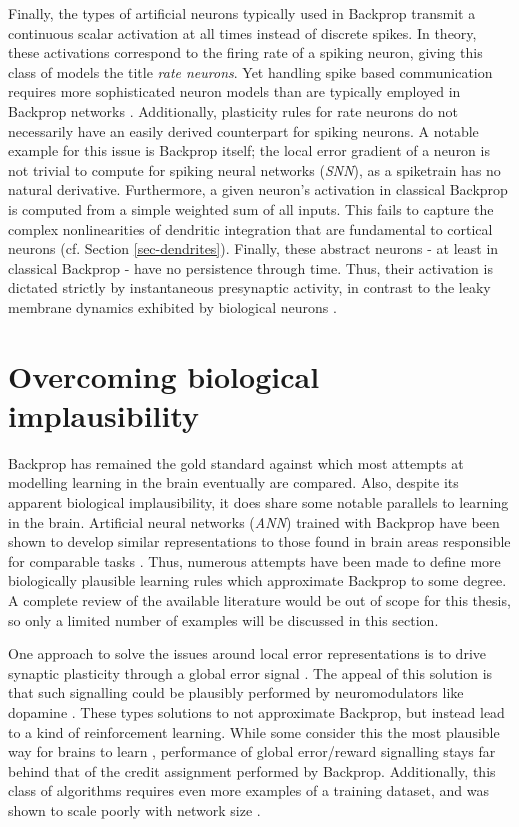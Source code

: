 Finally, the types of artificial neurons typically used in Backprop transmit a continuous scalar activation at all
times instead of discrete spikes. In theory, these activations correspond to the firing rate of a spiking neuron,
giving this class of models the title \textit{rate neurons}. Yet handling spike based communication requires more
sophisticated neuron models than are typically employed in Backprop networks \citep{Gerstner2009,Li2021}. Additionally,
plasticity rules for rate neurons do not necessarily have an easily derived counterpart for spiking neurons. A notable
example for this issue is Backprop itself; the local error gradient of a neuron is not trivial to compute for spiking
neural networks (\textit{SNN}), as a spiketrain has no natural derivative. Furthermore, a given neuron's activation in
classical Backprop is computed from a simple weighted sum of all inputs. This fails to capture the complex
nonlinearities of dendritic integration that are fundamental to cortical neurons (cf. Section \ref{sec-dendrites}).
Finally, these abstract neurons - at least in classical Backprop - have no persistence through time. Thus, their
activation is dictated strictly by instantaneous presynaptic activity, in contrast to the leaky membrane dynamics
exhibited by biological neurons \citep{Niebur2008}.

\section{Overcoming biological implausibility}

Backprop has remained the gold standard against which most attempts at modelling learning in the brain eventually are
compared. Also, despite its apparent biological implausibility, it does share some notable parallels to learning in the
brain. Artificial neural networks (\textit{ANN}) trained with Backprop have been shown to develop similar
representations to those found in brain areas responsible for comparable tasks
\citep{Yamins2016,Whittington2018,KhalighRazavi2014,Kubilius2016}. Thus, numerous attempts have been made to define more
biologically plausible learning rules which approximate Backprop to some degree. A complete review of the available
literature would be out of scope for this thesis, so only a limited number of examples will be discussed in this
section.

One approach to solve the issues around local error representations is to drive synaptic plasticity through a global
error signal \citep{potjans2011imperfect,mozafari2018combining,sutton2018reinforcement}. The appeal of this solution is
that such signalling could be plausibly performed by neuromodulators like dopamine
\citep{Mazzoni1991,Seung2003,izhikevich2007solving}. These types solutions to not approximate Backprop, but instead lead
to a kind of reinforcement learning. While some consider this the most plausible way for brains to learn
\citep{sutton2018reinforcement}, performance of global error/reward signalling stays far behind that of the credit
assignment performed by Backprop. Additionally, this class of algorithms requires even more examples of a training
dataset, and was shown to scale poorly with network size \citep{Werfel2003}.

